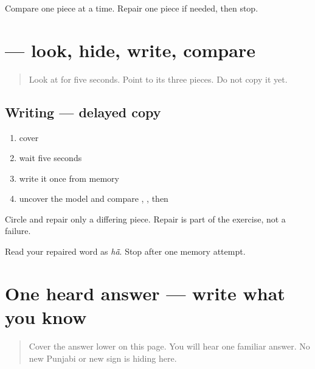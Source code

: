\begin{tcolorbox}[breakable,colback=teal!4,colframe=teal!35!black,title={Before you move on}]
Compare one piece at a time. Repair one piece if needed, then stop.
\end{tcolorbox}
\section[\texorpdfstring{\pa{ਹਾਂ} (hā̃)}{ਹਾਂ (hā̃)}]{ — look, hide, write, compare}

\label{lesson:PA-W01-haan-delayed-copy}



\begin{quote}
Look at \textbf{} for five seconds. Point to its three pieces. Do not copy it yet.
\end{quote}

\subsection*{Writing — delayed copy}
\begin{enumerate}
\raggedright
  \item cover \textbf{}
  \item wait five seconds
  \item write it once from memory
  \item uncover the model and compare \textbf{}, \textbf{}, then \textbf{}
\end{enumerate}

Circle and repair only a differing piece. Repair is part of the exercise, not a failure.

\begin{tcolorbox}[breakable,colback=teal!4,colframe=teal!35!black,title={Before you move on}]
Read your repaired word as \emph{hā̃}. Stop after one memory attempt.
\end{tcolorbox}
\section[\texorpdfstring{\pa{ਹਾਂ} (hā̃)}{ਹਾਂ (hā̃)}]{One heard answer — write what you know}

\label{lesson:PA-W01-haan-dictation}



\begin{quote}
Cover the answer lower on this page. You will hear one familiar answer. No new Punjabi or new sign is hiding here.
\end{quote}

